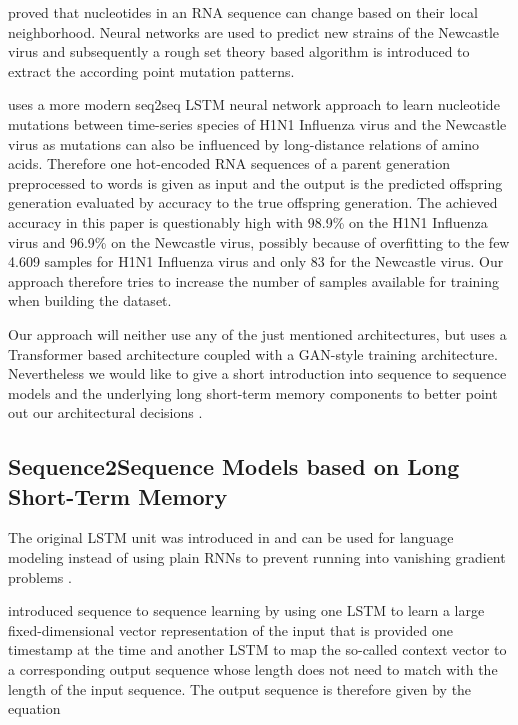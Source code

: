 \cite{Salama2016} proved that nucleotides in an RNA sequence can change based on their local neighborhood. Neural networks are used to predict new strains of the Newcastle virus and subsequently a rough set theory based algorithm is introduced to extract the according point mutation patterns. 

\cite{Mohamed2021} uses a more modern seq2seq LSTM neural network approach to learn nucleotide mutations between time-series species of H1N1 Influenza virus and the Newcastle virus as mutations can also be influenced by long-distance relations of amino acids. Therefore one hot-encoded RNA sequences of a parent generation preprocessed to words is given as input and the output is the predicted offspring generation evaluated by accuracy to the true offspring generation. The achieved accuracy in this paper is questionably high with 98.9\% on the H1N1 Influenza virus and 96.9\% on the Newcastle virus, possibly because of overfitting to the few 4.609 samples for H1N1 Influenza virus and only 83 for the Newcastle virus. Our approach therefore tries to increase the number of samples available for training when building the dataset. 

Our approach will neither use any of the just mentioned architectures, but uses a Transformer based architecture coupled with a GAN-style training architecture. Nevertheless we would like to give a short introduction into sequence to sequence models and the underlying long short-term memory components to better point out our architectural decisions . 

\subsection{Sequence2Sequence Models based on Long Short-Term Memory} \label{fundamentalsF}


The original \ac{LSTM} unit was introduced in \cite{Hochreiter1997} and can be used for language modeling instead of using plain \acp{RNN} to prevent running into vanishing gradient problems \cite{Sundermeyer2012}. 




\cite{bla} introduced sequence to sequence learning by using one LSTM to learn a large fixed-dimensional vector representation of the input that is provided one timestamp at the time and another \ac{LSTM} to map the so-called context vector to a corresponding output sequence whose length does not need to match with the length of the input sequence. The output sequence is therefore given by the equation

